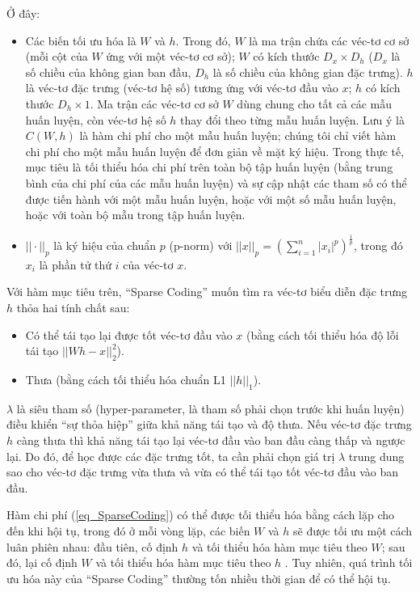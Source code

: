 Ở đây:
\begin{itemize}
	\item Các biến tối ưu hóa là $W$ và $h$. Trong đó, $W$ là ma trận chứa các véc-tơ cơ sở (mỗi cột của $W$ ứng với một véc-tơ cơ sở); $W$ có kích thước $D_x \times D_h$ ($D_x$ là số chiều của không gian ban đầu, $D_h$ là số chiều của không gian đặc trưng). $h$ là véc-tơ đặc trưng (véc-tơ hệ số) tương ứng với véc-tơ đầu vào $x$; $h$ có kích thước $D_h \times 1$. Ma trận các véc-tơ cơ sở $W$ dùng chung cho tất cả các mẫu huấn luyện, còn véc-tơ hệ số $h$ thay đổi theo từng mẫu huấn luyện. Lưu ý là $C(W, h)$ là hàm chi phí cho một mẫu huấn luyện; chúng tôi chỉ viết hàm chi phí cho một mẫu huấn luyện để đơn giản về mặt ký hiệu. Trong thực tế, mục tiêu là tối thiểu hóa chi phí trên toàn bộ tập huấn luyện (bằng trung bình của chi phí của các mẫu huấn luyện) và sự cập nhật các tham số có thể được tiến hành với một mẫu huấn luyện, hoặc với một số mẫu huấn luyện, hoặc với toàn bộ mẫu trong tập huấn luyện.
	\item $||\cdot||_p$ là ký hiệu của chuẩn $p$ (p-norm) với $||x||_p=\left(\sum_{i=1}^n|x_i|^p\right)^{\frac{1}{p}}$, trong đó $x_i$ là phần tử thứ $i$ của véc-tơ $x$.
\end{itemize}

Với hàm mục tiêu trên, ``Sparse Coding'' muốn tìm ra véc-tơ biểu diễn đặc trưng $h$ thỏa hai tính chất sau:
\begin{itemize}
	\item Có thể tái tạo lại được tốt véc-tơ đầu vào $x$ (bằng cách tối thiểu hóa độ lỗi tái tạo $||Wh - x||_2^2$).
	\item Thưa (bằng cách tối thiểu hóa chuẩn L1 $||h||_1$).
\end{itemize}

$\lambda$ là siêu tham số (hyper-parameter, là tham số phải chọn trước khi huấn luyện) điều khiển ``sự thỏa hiệp'' giữa khả năng tái tạo và độ thưa. Nếu véc-tơ đặc trưng $h$ càng thưa thì khả năng tái tạo lại véc-tơ đầu vào ban đầu càng thấp và ngược lại. Do đó, để học được các đặc trưng tốt, ta cần phải chọn giá trị $\lambda$ trung dung sao cho véc-tơ đặc trưng vừa thưa và vừa có thể tái tạo tốt véc-tơ đầu vào ban đầu. 

Hàm chi phí (\ref{eq_SparseCoding}) có thể được tối thiểu hóa bằng cách lặp cho đến khi hội tụ, trong đó ở mỗi vòng lặp, các biến $W$ và $h$ sẽ được tối ưu một cách luân phiên nhau: đầu tiên, cố định $h$ và tối thiểu hóa hàm mục tiêu theo $W$; sau đó, lại cố định $W$ và tối thiểu hóa hàm mục tiêu theo $h$ \cite{lee2006efficient}. Tuy nhiên, quá trình tối ưu hóa này của ``Sparse Coding'' thường tốn nhiều thời gian để có thể hội tụ.

